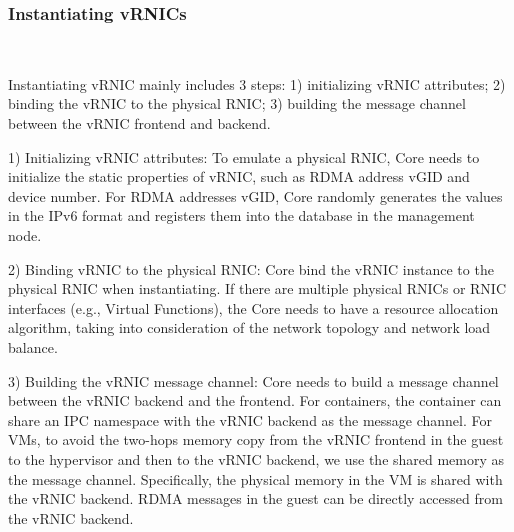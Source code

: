 \subsubsection{\textbf{Instantiating vRNICs}}
\
\noindent


Instantiating vRNIC mainly includes 3 steps: 1) initializing vRNIC attributes; 2) binding the vRNIC to the physical RNIC; 3) building the message channel between the vRNIC frontend and backend.


1) Initializing vRNIC attributes: To emulate a physical RNIC, \sys Core needs to initialize the static properties of vRNIC, such as RDMA address vGID and device number. For RDMA addresses vGID, \sys Core randomly generates the values in the IPv6 format and registers them into the database in the management node.


2) Binding vRNIC to the physical RNIC: \sys Core bind the vRNIC instance to the physical RNIC when instantiating. If there are multiple physical RNICs or RNIC interfaces (e.g., Virtual Functions), the \sys Core needs to have a resource allocation algorithm, taking into consideration of the network topology and network load balance.


3) Building the vRNIC message channel: \sys Core needs to build a message channel between the vRNIC backend and the frontend.
For containers, the container can share an IPC namespace with the vRNIC backend as the message channel.
For VMs, to avoid the two-hops memory copy from the vRNIC frontend in the guest to the hypervisor and then to the vRNIC backend, we use the shared memory as the message channel. Specifically, the physical memory in the VM is shared with the vRNIC backend. RDMA messages in the guest can be directly accessed from the vRNIC backend.

